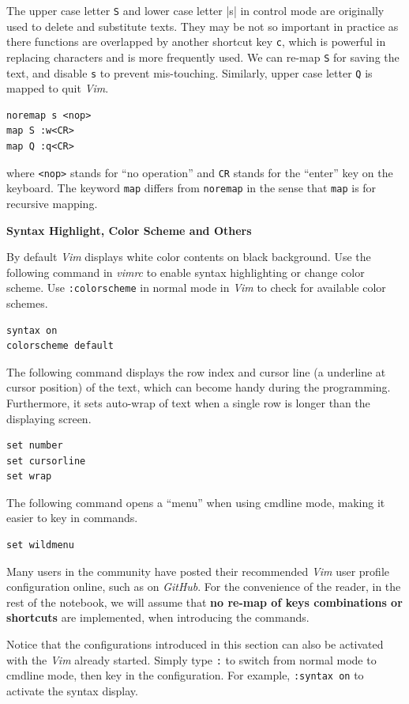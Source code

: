 The upper case letter \verb|S| and lower case letter |s| in control mode are originally used to delete and substitute texts. They may be not so important in practice as there functions are overlapped by another shortcut key \verb|c|, which is powerful in replacing characters and is more frequently used. We can re-map \verb|S| for saving the text, and disable \verb|s| to prevent mis-touching. Similarly, upper case letter \verb|Q| is mapped to quit \textit{Vim}.
\begin{verbatim}
noremap s <nop>
map S :w<CR>
map Q :q<CR>
\end{verbatim}
where \verb|<nop>| stands for ``no operation'' and \verb|CR| stands for the ``enter'' key on the keyboard. The keyword \verb|map| differs from \verb|noremap| in the sense that \verb|map| is for recursive mapping.

\vspace{0.1in}
\noindent \textbf{Syntax Highlight, Color Scheme and Others}
\vspace{0.1in}

By default \textit{Vim} displays white color contents on black background. Use the following command in \textit{vimrc} to enable syntax highlighting or change color scheme. Use \verb|:colorscheme| in normal mode in \textit{Vim} to check for available color schemes.
\begin{verbatim}
syntax on
colorscheme default
\end{verbatim}

The following command displays the row index and cursor line (a underline at cursor position) of the text, which can become handy during the programming. Furthermore, it sets auto-wrap of text when a single row is longer than the displaying screen.
\begin{verbatim}
set number
set cursorline
set wrap
\end{verbatim}

The following command opens a ``menu'' when using cmdline mode, making it easier to key in commands.
\begin{verbatim}
set wildmenu
\end{verbatim}

Many users in the community have posted their recommended \textit{Vim} user profile configuration online, such as on \textit{GitHub}. For the convenience of the reader, in the rest of the notebook, we will assume that \textbf{no re-map of keys combinations or shortcuts} are implemented, when introducing the commands.

Notice that the configurations introduced in this section can also be activated with the \textit{Vim} already started. Simply type \verb|:| to switch from normal mode to cmdline mode, then key in the configuration. For example, \verb|:syntax on| to activate the syntax display.

